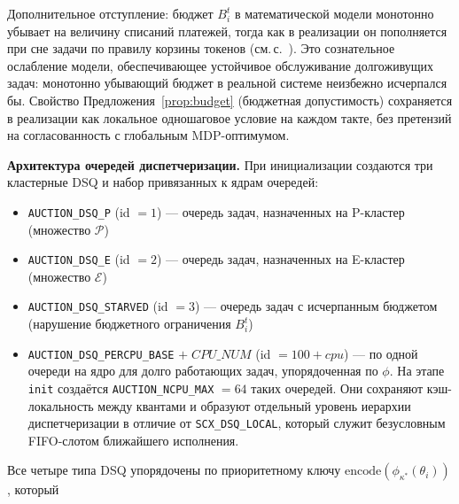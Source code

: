 \documentclass[14pt, oneside]{extbook}
\begin{document}
        Дополнительное отступление: бюджет $B_i^t$ в
        математической модели монотонно убывает на величину
        списаний платежей, тогда как в реализации он пополняется
        при сне задачи по правилу корзины токенов (см.\,с.~\pageref{para:budget}). Это сознательное ослабление модели,
        обеспечивающее устойчивое обслуживание долгоживущих
        задач: монотонно убывающий бюджет в реальной системе
        неизбежно исчерпался бы. Свойство
        Предложения~\ref{prop:budget} (бюджетная допустимость)
        сохраняется в реализации как локальное одношаговое
        условие на каждом такте, без претензий на согласованность
        с глобальным MDP-оптимумом.

        \textbf{Архитектура очередей диспетчеризации.}
        При инициализации создаются три кластерные DSQ и набор
        привязанных к ядрам очередей:
        \begin{itemize}
                \item \texttt{AUCTION\_DSQ\_P} (id $= 1$) ---
                        очередь задач, назначенных на P-кластер
                        (множество $\mathcal{P}$)
                \item \texttt{AUCTION\_DSQ\_E} (id $= 2$) ---
                        очередь задач, назначенных на E-кластер
                        (множество $\mathcal{E}$)
                \item \texttt{AUCTION\_DSQ\_STARVED} (id $= 3$) ---
                        очередь задач с исчерпанным бюджетом
                        (нарушение бюджетного ограничения
                        $B_i^t$)
                \item \texttt{AUCTION\_\allowbreak DSQ\_\allowbreak PERCPU\_BASE}
                        $+\;\mathit{CPU\_NUM}$ (id $= 100 + cpu$) ---
                        по одной очереди на ядро для долго
                        работающих задач, упорядоченная по
                        $\phi$. На этапе \texttt{init}
                        создаётся \texttt{AUCTION\_\allowbreak NCPU\_MAX}
                        $= 64$ таких очередей. Они сохраняют
                        кэш-локальность между квантами и
                        образуют отдельный уровень иерархии
                        диспетчеризации в отличие от
                        \texttt{SCX\_DSQ\_LOCAL}, который служит
                        безусловным FIFO-слотом ближайшего
                        исполнения.
        \end{itemize}
        Все четыре типа DSQ упорядочены по приоритетному ключу
        $\mathrm{encode}(\phi_{\kappa^*}(\theta_i))$, который
\end{document}
